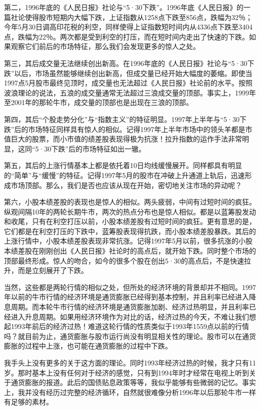 第二，1996年底的《人民日报》社论与“5·30下跌”。1996年底《人民日报》的一篇社论使得股市短期内大幅下跌，上证指数从1258点下跌至856点，跌幅为32％；今年5月30日调高印花税的利空，同样使得上证指数短时间内从4336点下跌至3404点，跌幅为22％。两次都是受到利空的打压，而在短时间内走出了快速的下跌。如果观察它们前后的市场特征，那么我们会发现更多的惊人之处。

第三，其后成交量无法继续创出新高。在1996年底的《人民日报》社论与“5·30下跌”以后，市场虽然能够继续创出新高，但成交量已经开始大幅度的萎缩。即使当1997点5月股市最终见顶时，成交量也无法超过《人民日报》社论前的水平。按照波浪理论的说法，五浪的成交量通常无法超过三浪成交量的顶部。事实上，1999年至2001年的那轮牛市，成交量的顶部也是出现在三浪的顶部。

第四，其后“个股走势分化”与“指数主义”的特征明显。1997年上半年与“5·30下跌”后的市场特征同样具有惊人的相似。记得1997年上半年市场中的领头羊都是市值巨大的股票，而小市值的绩差股表现得极为抗涨！拉升指数的运作手法非常明显，这同“5·30下跌”后的市场特征如出一辙。

第五，其后的上涨行情基本上都是依托着10日均线缓慢展开。同样都具有明显的“简单”与“缓慢”的特征。记得1997年5月的股市在冲破上升通道上轨后，迅速形成市场顶部。那么，我们是否也应该从现在开始，密切地关注市场的异动呢？

第六，小股本绩差股的表现也是惊人的相似。两头疲弱，中间有过短时间的疯狂。纵观间隔10年的两轮长期牛市，两次的热点分布也是惊人相似。都是以蓝筹股发动和收尾，只有在利空打压以前，小股本绩差股有过短时间的疯狂。更有意思的是，它们都是在利空打压的下跌中，蓝筹股表现得抗跌，而小股本绩差股暴跌。其后的上涨行情中，小股本绩差股表现非常抗涨。记得1997年5月以前，很多抗涨的小股本绩差股在刚刚创出《人民日报》社论时的高点后，就开始下跌。同时整个市场的顶部最终形成。惊人的吻合，如今的很多个股在创出5·30的高点后，不是快速拉升，而是立刻展开了下跌。

当然，这些都是两轮行情的相似之处，但所处的经济环境的背景却并不相同。1997年以前的牛市行情的经济环境是通货膨胀已经得到基本控制，并且利率已经进入降息周期。而本轮牛市行情的经济环境是通货膨胀加剧、经济过热明显，并且利率已经进入升息周期。如果用经济环境作为对比的话，经济过热的今天，不难让我们想起1993年前后的经济过热！难道这轮行情的性质类似于1993年1559点以前的行情吗？就目前为止，通货膨胀与股市运行尚没有明显相关性的理论。股市可以在通货膨胀的过程中上涨，也可能在通货膨胀的过程中下跌。

我手头上没有更多的关于这方面的理论。同时1993年经济过热的时候，我才只有11岁。那时基本上没有任何对于经济的感觉，只有到1994年时才经常在电视上听到关于通货膨胀的报道。此后的国债贴息政策等等，我似乎能够有些微弱的记忆。事实上，我并没有经历过完整的经济循环，自然就很难像分析1996年以后那轮牛市一样有足够的素材。

